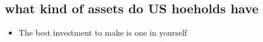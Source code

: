 \documentclass[11pt]{article}
\begin{document}
\subsection{what kind of assets do US hoeholds have}
\label{sec:orgf011ae9}
\begin{itemize}
\item The best investment to make is one in yourself
\end{itemize}


\section{}
\label{sec:org1cd6a04}
\section{}
\label{sec:orgbf93487}
\end{document}
